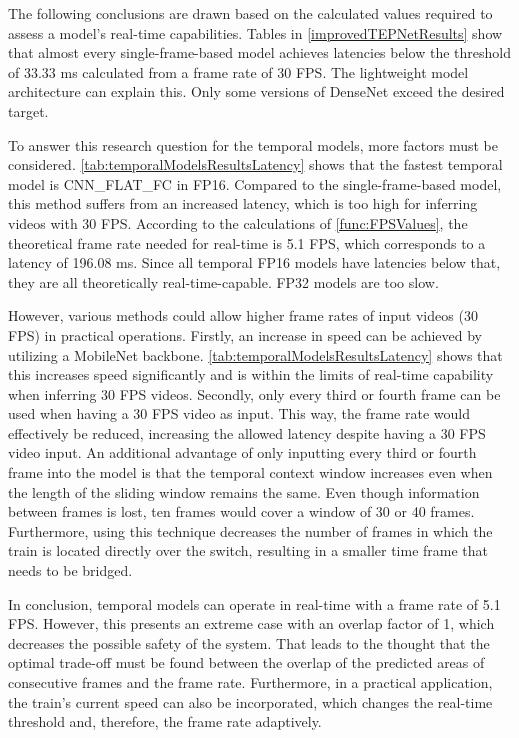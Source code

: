 \noindent The following conclusions are drawn based on the calculated values required to assess a model's real-time capabilities.
Tables in \autoref{improvedTEPNetResults} show that almost every single-frame-based model achieves latencies below the threshold of 33.33 ms calculated from a frame rate of 30 \ac{FPS}.
The lightweight model architecture can explain this.
Only some versions of DenseNet exceed the desired target.

To answer this research question for the temporal models, more factors must be considered.
\autoref{tab:temporalModelsResultsLatency} shows that the fastest temporal model is CNN\_FLAT\_FC in FP16.
Compared to the single-frame-based model, this method suffers from an increased latency, which is too high for inferring videos with 30 \ac{FPS}.
According to the calculations of \autoref{func:FPSValues}, the theoretical frame rate needed for real-time is 5.1 \ac{FPS}, which corresponds to a latency of 196.08 ms.
Since all temporal FP16 models have latencies below that, they are all theoretically real-time-capable.
FP32 models are too slow.

However, various methods could allow higher frame rates of input videos (30 \ac{FPS}) in practical operations.
Firstly, an increase in speed can be achieved by utilizing a MobileNet backbone.
\autoref{tab:temporalModelsResultsLatency} shows that this increases speed significantly and is within the limits of real-time capability when inferring 30 \ac{FPS} videos.
Secondly, only every third or fourth frame can be used when having a 30 \ac{FPS} video as input.
This way, the frame rate would effectively be reduced, increasing the allowed latency despite having a 30 \ac{FPS} video input.
An additional advantage of only inputting every third or fourth frame into the model is that the temporal context window increases even when the length of the sliding window remains the same.
Even though information between frames is lost, ten frames would cover a window of 30 or 40 frames.
Furthermore, using this technique decreases the number of frames in which the train is located directly over the switch, resulting in a smaller time frame that needs to be bridged.

\clearpage

\noindent In conclusion, temporal models can operate in real-time with a frame rate of 5.1 \ac{FPS}.
However, this presents an extreme case with an overlap factor of 1, which decreases the possible safety of the system.
That leads to the thought that the optimal trade-off must be found between the overlap of the predicted areas of consecutive frames and the frame rate.
Furthermore, in a practical application, the train's current speed can also be incorporated, which changes the real-time threshold and, therefore, the frame rate adaptively.

